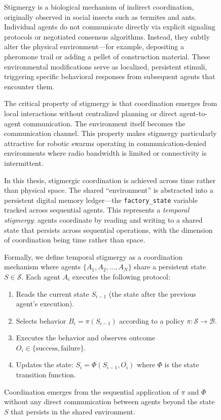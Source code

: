 \documentclass[12pt,a4paper,oneside]{report}
\begin{document}
\begin{figure}[H]
Stigmergy is a biological mechanism of indirect coordination, originally observed in social insects such as termites and ants. Individual agents do not communicate directly via explicit signaling protocols or negotiated consensus algorithms. Instead, they subtly alter the physical environment---for example, depositing a pheromone trail or adding a pellet of construction material. These environmental modifications serve as localized, persistent stimuli, triggering specific behavioral responses from subsequent agents that encounter them.

The critical property of stigmergy is that coordination emerges from local interactions without centralized planning or direct agent-to-agent communication. The environment itself becomes the communication channel. This property makes stigmergy particularly attractive for robotic swarms operating in communication-denied environments where radio bandwidth is limited or connectivity is intermittent.

In this thesis, stigmergic coordination is achieved across time rather than physical space. The shared ``environment'' is abstracted into a persistent digital memory ledger---the \texttt{factory\_state} variable tracked across sequential agents. This represents a \textit{temporal stigmergy}: agents coordinate by reading and writing to a shared state that persists across sequential operations, with the dimension of coordination being time rather than space.

Formally, we define temporal stigmergy as a coordination mechanism where agents $\{A_1, A_2, \ldots, A_N\}$ share a persistent state $S \in \mathcal{S}$. Each agent $A_i$ executes the following protocol:
\begin{enumerate}
    \item Reads the current state $S_{i-1}$ (the state after the previous agent's execution).
    \item Selects behavior $B_i = \pi(S_{i-1})$ according to a policy $\pi: \mathcal{S} \rightarrow \mathcal{B}$.
    \item Executes the behavior and observes outcome $O_i \in \{\text{success}, \text{failure}\}$.
    \item Updates the state: $S_i = \Phi(S_{i-1}, O_i)$ where $\Phi$ is the state transition function.
\end{enumerate}

Coordination emerges from the sequential application of $\pi$ and $\Phi$ without any direct communication between agents beyond the state $S$ that persists in the shared environment.


\end{figure}
\end{document}
